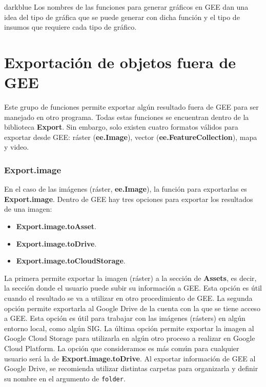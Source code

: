 \documentclass[
  12pt,
  letterpaper,
  twoside]{book}
\providecommand{\tightlist}{%
  \setlength{\itemsep}{0pt}\setlength{\parskip}{0pt}}
\newcommand\boldpurple[1]{\textcolor{darkpurple}{\textbf{#1}}}
\begin{document}
\begin{bluebox2}

\begin{awesomeblock}{5pt}{\faLightbulb}{darkblue}
Los nombres de las funciones para generar gráficos en GEE dan una idea del tipo de gráfica que se puede generar con dicha función y el tipo de insumos que requiere cada tipo de gráfico.

\end{awesomeblock}

\end{bluebox2}

\hypertarget{exportaciuxf3n-de-objetos-fuera-de-gee}{%
\section{Exportación de objetos fuera de GEE}\label{exportaciuxf3n-de-objetos-fuera-de-gee}}

Este grupo de funciones permite exportar algún resultado fuera de GEE para ser manejado en otro programa. Todas estas funciones se encuentran dentro de la biblioteca \boldpurple{Export}. Sin embargo, solo existen cuatro formatos válidos para exportar desde GEE: ráster (\boldpurple{ee.Image}), vector (\boldpurple{ee.FeatureCollection}), mapa y video.

\hypertarget{export.image}{%
\subsubsection*{Export.image}\label{export.image}}

En el caso de las imágenes (ráster, \boldpurple{ee.Image}), la función para exportarlas es \boldpurple{Export.image}. Dentro de GEE hay tres opciones para exportar los resultados de una imagen:

\begin{itemize}
\tightlist
\item
  \boldpurple{Export.image.toAsset}.
\item
  \boldpurple{Export.image.toDrive}.
\item
  \boldpurple{Export.image.toCloudStorage}.
\end{itemize}

La primera permite exportar la imagen (ráster) a la sección de \textbf{Assets}, es decir, la sección donde el usuario puede subir su información a GEE. Esta opción es útil cuando el resultado se va a utilizar en otro procedimiento de GEE. La segunda opción permite exportarla al Google Drive de la cuenta con la que se tiene acceso a GEE. Esta opción es útil para trabajar con las imágenes (rásters) en algún entorno local, como algún SIG. La última opción permite exportar la imagen al Google Cloud Storage para utilizarla en algún otro proceso a realizar en Google Cloud Platform. La opción que consideramos es más común para cualquier usuario será la de \boldpurple{Export.image.toDrive}. Al exportar información de GEE al Google Drive, se recomienda utilizar distintas carpetas para organizarla y definir su nombre en el argumento de \texttt{folder}.
\end{document}
